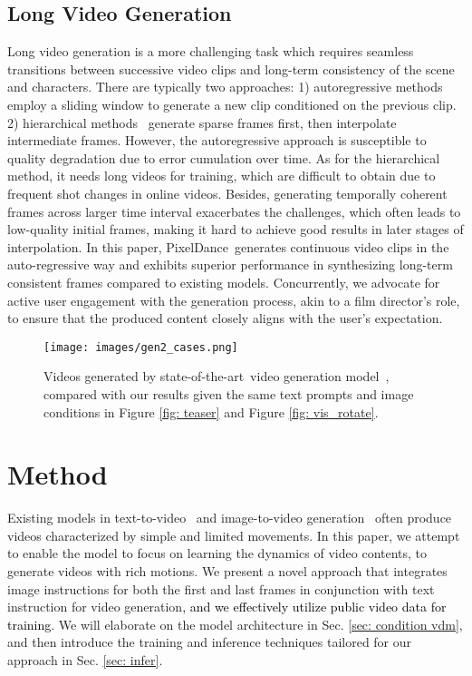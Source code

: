 \documentclass[10pt,twocolumn,letterpaper]{article}
\newcommand{\tcr}{\textcolor{black}}
\newcommand{\sota}{{state-of-the-art}}
\newcommand{\ours}{{PixelDance}}
\begin{document}
\subsection{Long Video Generation}

Long video generation is a more challenging task which requires seamless transitions between successive video clips and long-term consistency of the scene and characters. There are typically two approaches: 1) autoregressive methods~\cite{VDM, villegas2023phenaki,harvey2022flexible} employ a sliding window to generate a new clip conditioned on the previous clip. 2) hierarchical methods~\cite{ge2022long, he2022latent, harvey2022flexible,yin2023nuwa} generate sparse frames first, then interpolate intermediate frames. However, the autoregressive approach is susceptible to quality degradation due to error cumulation over time. As for the hierarchical method, it needs long videos for training, which are difficult to obtain due to frequent shot changes in online videos. Besides, generating temporally coherent frames across larger time interval exacerbates the challenges, which often leads to low-quality initial frames, making it hard to achieve good results in later stages of interpolation. In this paper, \ours~generates continuous video clips in the auto-regressive way and exhibits superior performance in synthesizing long-term consistent frames compared to existing models. Concurrently, we advocate for active user engagement with the generation process, akin to a film director's role, to ensure that the produced content closely aligns with the user's expectation.


\begin{figure}[t]
  \centering
  \texttt{[image: images/gen2\_cases.png]}
  \caption{Videos generated by \sota~video generation model~\cite{GEN2}, compared with our results given the same text prompts and image conditions in Figure \ref{fig: teaser} and Figure \ref{fig: vis_rotate}. 
  }
  \label{fig: gen2_cases}
\end{figure}



 \section{Method}
\label{sec: method}

Existing models in text-to-video~\cite{VDM,zhou2022magicvideo,ge2023preserve} and image-to-video generation~\cite{GEN2,li2023videogen,wang2023modelscope} often produce videos characterized by simple and limited movements. In this paper, we attempt to enable the model to focus on learning the dynamics of video contents, to generate videos with rich motions. We present a novel approach that integrates image instructions for both the first and last frames in conjunction with text instruction for video generation\tcr{, and we effectively utilize public video data for training}. We will elaborate on the model architecture in Sec. \ref{sec: condition vdm}, and then introduce the training and inference techniques tailored for our approach in Sec. \ref{sec: infer}.
\end{document}
